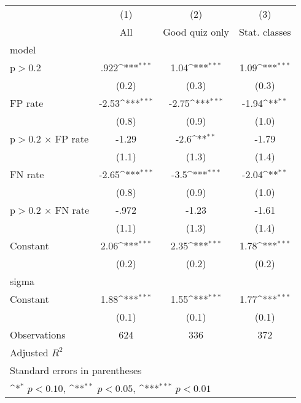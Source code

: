 {
\def\sym#1{\ifmmode^{#1}\else\(^{#1}\)\fi}
\begin{tabular}{l*{3}{c}}
\hline\hline
                &\multicolumn{1}{c}{(1)}&\multicolumn{1}{c}{(2)}&\multicolumn{1}{c}{(3)}\\
                &\multicolumn{1}{c}{All}&\multicolumn{1}{c}{Good quiz only}&\multicolumn{1}{c}{Stat. classes}\\
\hline
model           &                  &                  &                  \\
p$>$0.2         &     .922\sym{***}&     1.04\sym{***}&     1.09\sym{***}\\
                &    (0.2)         &    (0.3)         &    (0.3)         \\
FP rate         &    -2.53\sym{***}&    -2.75\sym{***}&    -1.94\sym{**} \\
                &    (0.8)         &    (0.9)         &    (1.0)         \\
p$>$0.2 $\times$ FP rate&    -1.29         &     -2.6\sym{**} &    -1.79         \\
                &    (1.1)         &    (1.3)         &    (1.4)         \\
FN rate         &    -2.65\sym{***}&     -3.5\sym{***}&    -2.04\sym{**} \\
                &    (0.8)         &    (0.9)         &    (1.0)         \\
p$>$0.2 $\times$ FN rate&    -.972         &    -1.23         &    -1.61         \\
                &    (1.1)         &    (1.3)         &    (1.4)         \\
Constant        &     2.06\sym{***}&     2.35\sym{***}&     1.78\sym{***}\\
                &    (0.2)         &    (0.2)         &    (0.2)         \\
\hline
sigma           &                  &                  &                  \\
Constant        &     1.88\sym{***}&     1.55\sym{***}&     1.77\sym{***}\\
                &    (0.1)         &    (0.1)         &    (0.1)         \\
\hline
Observations    &      624         &      336         &      372         \\
Adjusted \(R^{2}\)&                  &                  &                  \\
\hline\hline
\multicolumn{4}{l}{\footnotesize Standard errors in parentheses}\\
\multicolumn{4}{l}{\footnotesize \sym{*} \(p<0.10\), \sym{**} \(p<0.05\), \sym{***} \(p<0.01\)}\\
\end{tabular}
}
